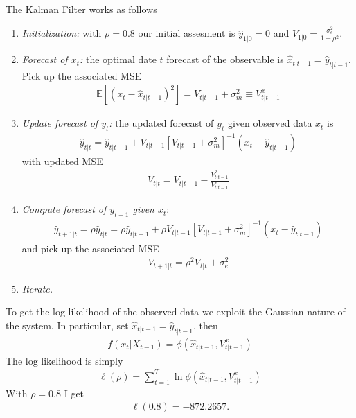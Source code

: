 \documentclass[12pt]{article}
\newcommand{\E}{\mathbb{E}}
\begin{document}
\subsection{}
The Kalman Filter works as follows
\begin{enumerate}
\item \textit{Initialization:} with $\rho=0.8$ our initial assesment is $\hat y_{1|0} = 0$ and $V_{1|0} = \frac{\sigma^2_e}{1-\rho^2}$. 
\item \textit{Forecast of $x_t$:} the optimal date $t$ forecast of the observable is $\hat x_{t|t-1} = \hat y_{t|t-1}$. Pick up the associated MSE
\begin{align*}
\E[(x_t - \hat x_{t|t-1})^2] = V_{t|t-1} + \sigma^2_m \equiv V^x_{t|t-1}
\end{align*}
\item \textit{Update forecast of $y_t$:} the updated forecast of $y_t$ given observed data $x_t$ is
\begin{align*}
\hat y_{t|t} = \hat y_{t|t-1} + V_{t|t-1}[V_{t|t-1} + \sigma^2_m]^{-1}(x_t - \hat y_{t|t-1})
\end{align*}
with updated MSE
\begin{align*}
V_{t|t} = V_{t|t-1} -\frac{V_{t|t-1}^2}{V^x_{t|t-1}}
\end{align*}
\item \textit{Compute forecast of $y_{t+1}$ given $x_t$}:
\begin{align*}
\hat y_{t+1|t} = \rho \hat y_{t|t} = \rho \hat y_{t|t-1} + \rho V_{t|t-1}[V_{t|t-1} + \sigma^2_m]^{-1}(x_t - \hat y_{t|t-1})
\end{align*}
and pick up the associated MSE
\begin{align*}
V_{t+1|t} = \rho^2 V_{t|t} + \sigma^2_e
\end{align*}
\item \textit{Iterate.}
\end{enumerate}
To get the log-likelihood of the observed data we exploit the Gaussian nature of the system. In particular, set $\hat x_{t|t-1} = \hat y_{t|t-1}$, then
\begin{align*}
f(x_t | X_{t-1}) = \phi(\hat x_{t|t-1}, V^x_{t|t-1})
\end{align*}
The log likelihood is simply
\begin{align*}
\ell(\rho) = \sum_{t=1}^T \ln \phi(\hat x_{t|t-1}, V^x_{t|t-1})
\end{align*}
With $\rho = 0.8$ I get
\begin{align*}
\ell(0.8) = -872.2657.
\end{align*}
\end{document}
